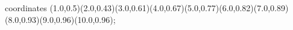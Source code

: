 					coordinates { (1.0,0.5)(2.0,0.43)(3.0,0.61)(4.0,0.67)(5.0,0.77)(6.0,0.82)(7.0,0.89)(8.0,0.93)(9.0,0.96)(10.0,0.96)};